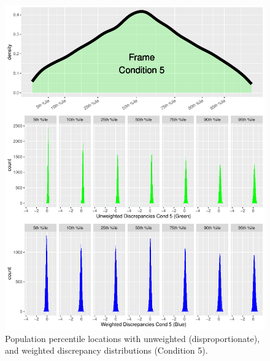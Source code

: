 \documentclass[
  ,man]{apa6}
\begin{document}
\begin{figure}
\centering
\includegraphics{NormsBuilding_files/figure-latex/Figure7-1.pdf}
\caption{\label{fig:Figure7}Population percentile locations with unweighted (disproportionate), and weighted discrepancy distributions (Condition 5).}
\end{figure}
\end{document}
